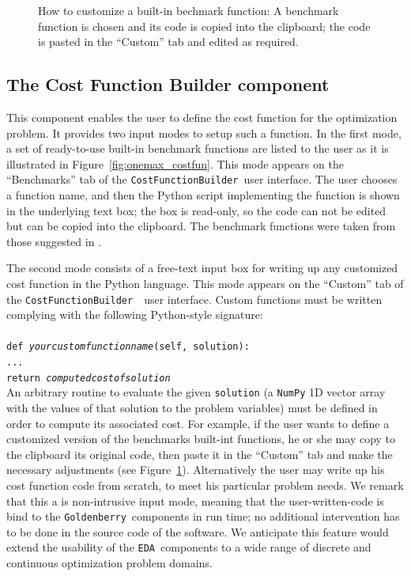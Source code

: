 \documentclass{sig-alternate}
\newcommand{\GB}{\texttt{Goldenberry}}
\newcommand{\EDA}{\texttt{EDA}}
\newcommand{\CostFunction}{\texttt{CostFunctionBuilder}}
\newcommand{\figref}[1]{\mbox{Figure \ref{#1}}}
\begin{document}
\begin{figure}[H]
{	\label{fig:custom2}}
	\caption{How to customize a built-in bechmark function:  A benchmark function is chosen and its code is copied into the clipboard;  the code is pasted in the ``Custom'' tab and edited as required.}
	\label{fig:custom_costfun}
\end{figure}

\subsection{The Cost Function Builder component}
This component enables the user to define the cost function for the optimization problem. It provides two input modes to setup such a function. In the first mode, a set of ready-to-use built-in benchmark functions are listed to the user as it is illustrated in \figref{fig:onemax_costfun}. This mode appears on the ``Benchmarks'' tab of the \CostFunction~user interface. The user chooses a function name, and then the Python script implementing the function is shown in the underlying text box; the box is read-only, so the code can not be edited but can be copied into the clipboard. The benchmark functions were taken from those suggested in \cite{Luke2009}.

The second mode consists of a free-text input box for writing up any customized cost function in the Python language. This mode appears on the ``Custom'' tab of the \CostFunction~~user interface. Custom functions must be written complying with the following Python-style signature: \\\\
\texttt{def \emph{yourcustomfunctionname}(self, solution):}\\ 
\texttt{...}\\
\texttt{return \emph{computedcostofsolution}}\\

An arbitrary routine to evaluate the given \texttt{solution} (a \texttt{NumPy} 1D vector array with the values of that solution to the problem variables) must be defined in order to compute its associated cost. For example, if the user wants to define a customized version of the benchmarks built-int functions, he or she may copy to the clipboard its original code, then paste it in the ``Custom'' tab and make the necessary adjustments (see \figref{fig:custom_costfun}). Alternatively the user may write up his cost function code from scratch, to meet his particular problem needs. We remark that this a is non-intrusive input mode, meaning that the user-written-code is bind to the \GB~components in run time; no additional intervention has to be done in the source code of the software. We anticipate this feature would extend the usability of the \EDA~components to a wide range of discrete and continuous optimization problem domains.
\end{document}
